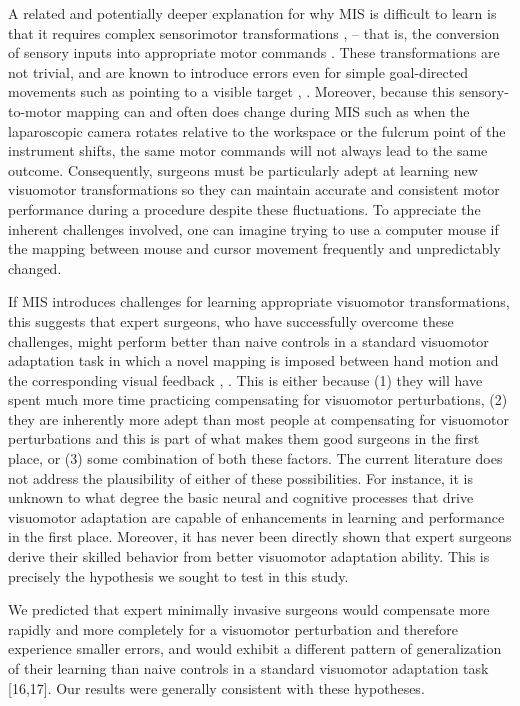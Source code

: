 \documentclass[man, 11pt, longtable, floatsintext, notab]{apa6}
\begin{document}
A related and potentially deeper explanation for why MIS is
difficult to learn is that it requires complex sensorimotor
transformations \cite{prinz_action_2013},
\cite{prinz_tool_2013} -- that is, the conversion of sensory
inputs into appropriate motor commands
\cite{pouget_computational_2000}. These transformations are
not trivial, and are known to introduce errors even for
simple goal-directed movements such as pointing to a visible
target \cite{soechting_errors_1989},
\cite{sober_flexible_2005}. Moreover, because this
sensory-to-motor mapping can and often does change during
MIS such as when the laparoscopic camera rotates relative to
the workspace or the fulcrum point of the instrument shifts,
the same motor commands will not always lead to the same
outcome. Consequently, surgeons must be particularly adept
at learning new visuomotor transformations so they can
maintain accurate and consistent motor performance during a
procedure despite these fluctuations. To appreciate the
inherent challenges involved, one can imagine trying to use
a computer mouse if the mapping between mouse and cursor
movement frequently and unpredictably changed.

If MIS introduces challenges for learning appropriate
visuomotor transformations, this suggests that expert
surgeons, who have successfully overcome these challenges,
might perform better than naive controls in a standard
visuomotor adaptation task in which a novel mapping is
imposed between hand motion and the corresponding visual
feedback \cite{cunningham_aiming_1989},
\cite{sternad_motor_2009}. This is either because (1) they
will have spent much more time practicing compensating for
visuomotor perturbations, (2) they are inherently more adept
than most people at compensating for visuomotor
perturbations and this is part of what makes them good
surgeons in the first place, or (3) some combination of both
these factors. The current literature does not address the
plausibility of either of these possibilities. For instance,
it is unknown to what degree the basic neural and cognitive
processes that drive visuomotor adaptation are capable of
enhancements in learning and performance in the first place.
Moreover, it has never been directly shown that expert
surgeons derive their skilled behavior from better
visuomotor adaptation ability. This is precisely the
hypothesis we sought to test in this study.

We predicted that expert minimally invasive surgeons would
compensate more rapidly and more completely for a visuomotor
perturbation and therefore experience smaller errors, and
would exhibit a different pattern of generalization of their
learning than naive controls in a standard visuomotor
adaptation task [16,17]. Our results were generally
consistent with these hypotheses.
\end{document}

